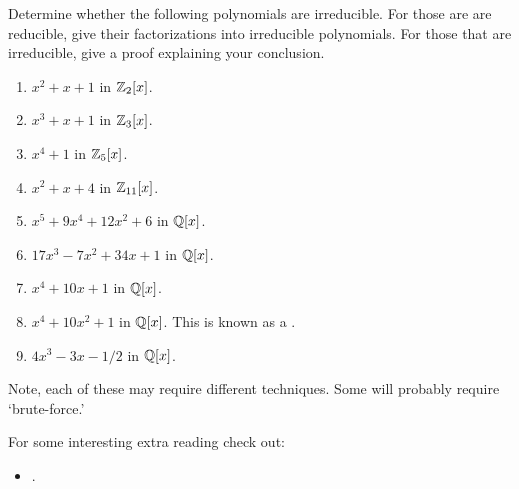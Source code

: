 \documentclass{ximera}
\begin{document}
\begin{exercise}
  Determine whether the following polynomials are irreducible. For those
  are are reducible, give their factorizations into irreducible
  polynomials. For those that are irreducible, give a proof explaining
  your conclusion.
  \begin{enumerate}
  \item $x^2 + x +1$ in $\mathbb Z_2[x]$.
  \item $x^3 + x + 1$ in $\mathbb Z_3[x]$.
  \item $x^4+1$ in $\mathbb Z_5[x]$.
  \item $x^2 + x + 4$ in $\mathbb Z_{11}[x]$.
  \item $x^5 + 9x^4 + 12x^2 + 6$ in  $\mathbb Q[x]$.
  \item $17 x^3 - 7x^2 + 34x + 1$ in $\mathbb Q[x]$.
  \item $x^4 + 10x + 1$ in $\mathbb Q[x]$.
  \item $x^4 + 10x^2 + 1$ in $\mathbb Q[x]$. This is known as a
    .
  \item $4x^3 -3x -1/2$ in $\mathbb Q[x]$.
  \end{enumerate}
  \begin{hint}
    Note, each of these may require different techniques. Some will
    probably require `brute-force.'
  \end{hint}
\end{exercise}





For some interesting extra reading check out:
\begin{itemize}
\item {}.

\end{itemize}
\end{document}
